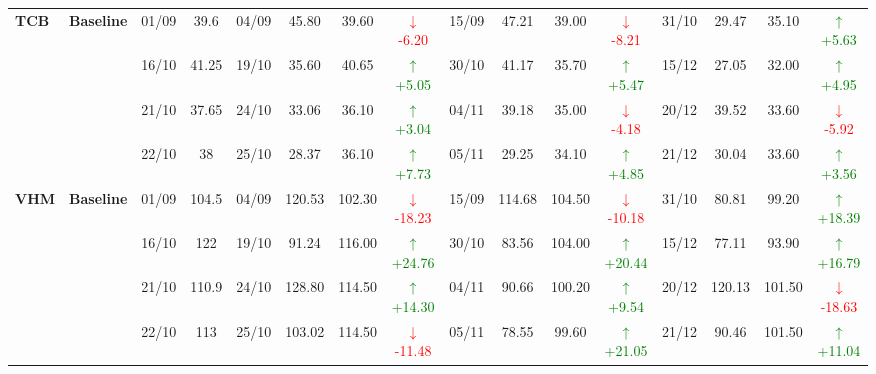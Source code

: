 \documentclass{ieeeaccess}
\begin{document}
{\begin{longtable}{llcc|cccc|cccc|cccc}
\multirow{4}{*}{\textbf{TCB}}
& \textbf{Baseline}
& 01/09 & 39.6 & 04/09 & 45.80 & 39.60 & \textcolor{red}{\(\downarrow\)-6.20} & 15/09 & 47.21 & 39.00 & \textcolor{red}{\(\downarrow\)-8.21} & 31/10 & 29.47 & 35.10 & \textcolor{green}{\(\uparrow\)+5.63} \\
& & 16/10 & 41.25 & 19/10 & 35.60 & 40.65 & \textcolor{green}{\(\uparrow\)+5.05} & 30/10 & 41.17 & 35.70 & \textcolor{green}{\(\uparrow\)+5.47} & 15/12 & 27.05 & 32.00 & \textcolor{green}{\(\uparrow\)+4.95} \\
& & 21/10 & 37.65 & 24/10 & 33.06 & 36.10 & \textcolor{green}{\(\uparrow\)+3.04} & 04/11 & 39.18 & 35.00 & \textcolor{red}{\(\downarrow\)-4.18} & 20/12 & 39.52 & 33.60 & \textcolor{red}{\(\downarrow\)-5.92} \\
& & 22/10 & 38 & 25/10 & 28.37 & 36.10 & \textcolor{green}{\(\uparrow\)+7.73} & 05/11 & 29.25 & 34.10 & \textcolor{green}{\(\uparrow\)+4.85} & 21/12 & 30.04 & 33.60 & \textcolor{green}{\(\uparrow\)+3.56} \\
\midrule

\multirow{4}{*}{\textbf{VHM}}
& \textbf{Baseline}
& 01/09 & 104.5 & 04/09 & 120.53 & 102.30 & \textcolor{red}{\(\downarrow\)-18.23} & 15/09 & 114.68 & 104.50 & \textcolor{red}{\(\downarrow\)-10.18} & 31/10 & 80.81 & 99.20 & \textcolor{green}{\(\uparrow\)+18.39} \\
& & 16/10 & 122 & 19/10 & 91.24 & 116.00 & \textcolor{green}{\(\uparrow\)+24.76} & 30/10 & 83.56 & 104.00 & \textcolor{green}{\(\uparrow\)+20.44} & 15/12 & 77.11 & 93.90 & \textcolor{green}{\(\uparrow\)+16.79} \\
& & 21/10 & 110.9 & 24/10 & 128.80 & 114.50 & \textcolor{green}{\(\uparrow\)+14.30} & 04/11 & 90.66 & 100.20 & \textcolor{green}{\(\uparrow\)+9.54} & 20/12 & 120.13 & 101.50 & \textcolor{red}{\(\downarrow\)-18.63} \\
& & 22/10 & 113 & 25/10 & 103.02 & 114.50 & \textcolor{red}{\(\downarrow\)-11.48} & 05/11 & 78.55 & 99.60 & \textcolor{green}{\(\uparrow\)+21.05} & 21/12 & 90.46 & 101.50 & \textcolor{green}{\(\uparrow\)+11.04} \\
\midrule


\end{longtable}}
\end{document}
